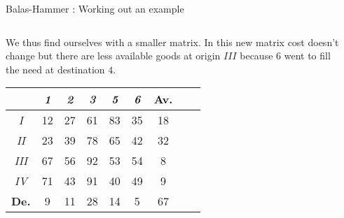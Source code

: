 \documentclass[32pt,aspectratio=169]{beamer}
\begin{document}
\begin{frame}{Balas-Hammer : Working out an example}
  \begin{columns}
    \begin{column}{.6\textwidth}
      We thus find ourselves with a smaller matrix. In this new matrix
      cost doesn't change but there are less available goods at origin
      $III$ because $6$ went to fill the need at destination $4$.

      \begin{overlayarea}{\textwidth}{.5\textheight}      
        \vspace{.22cm}
        \small{
          \begin{tabular}{c|c|c|c|c|c|c|c|r}
            & \textit{1} & \textit{2} & \textit{3} & \textit{5} & \textit{6} & \cellcolor{blue!50}\textbf{Av.} \\
            \hline
            \textit{I} & \cellcolor{blue!25}12 & \cellcolor{blue!25}27 & \cellcolor{blue!25}61 & \cellcolor{blue!25}83 & \cellcolor{blue!25}35 & \cellcolor{blue!50}18 \\
            \hline 
            \textit{II} & \cellcolor{blue!25}23 & \cellcolor{blue!25}39 & \cellcolor{blue!25}78 &  \cellcolor{blue!25}65 & \cellcolor{blue!25}42 & \cellcolor{blue!50}32 \\
            \hline
            \textit{III} & \cellcolor{blue!25}67 & \cellcolor{blue!25}56 & \cellcolor{blue!25}92 & \cellcolor{blue!25}53 & \cellcolor{blue!25}54 & \cellcolor{blue!50}8 \\
            \hline
            \textit{IV} & \cellcolor{blue!25}71 & \cellcolor{blue!25}43 & \cellcolor{blue!25}91 & \cellcolor{blue!25}40 & \cellcolor{blue!25}49 & \cellcolor{blue!50}9 \\
            \hline 
            \cellcolor{blue!50}\textbf{De.} & \cellcolor{blue!50}9 & \cellcolor{blue!50}11 & \cellcolor{blue!50}28 & \cellcolor{blue!50}14 & \cellcolor{blue!50}5 & \cellcolor{blue!60}67  \\            
          \end{tabular}
        }
      \end{overlayarea}
    \end{column}
    \begin{column}{.4\textwidth}
        \begin{tikzpicture}
        [scale =.8, minimum width={width("28")+1.5em},
        origin/.style={circle,draw=blue!50,fill=blue!20,thick},
        destination/.style={circle,draw=black!50,fill=black!20,thick},
        arr/.style={->,>=stealth',semithick}]

\end{tikzpicture}
\end{column}
\end{columns}
\end{frame}
\end{document}

